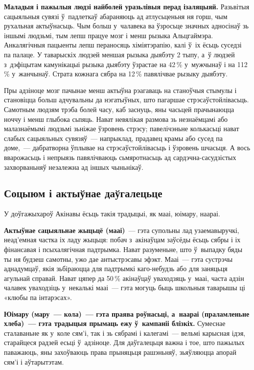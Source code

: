 \textbf{Маладыя і пажылыя людзі найболей уразьлівыя перад ізаляцыяй.} Разьвітыя сацыяльныя сувязі ў~падлеткаў абараняюць ад атлусьценьня ня горш, чым рухальная актыўнасьць. Чым больш у~чалавека ва ўзросьце значных адносінаў зь іншымі людзьмі, тым лепш працуе мозг і менш рызыка Альцгаймэра. Анкалягічныя пацыенты лепш пераносяць хіміятэрапію, калі ў~іх ёсьць суседзі па палаце. У таварыскіх людзей меншая рызыка дыябэту 2 тыпу, а~ў людзей з~дэфіцытам камунікацыі рызыка дыябэту ўзрастае на 42\,\% у~мужчынаў і на 112\,\% у~жанчынаў. Страта кожнага сябра на 12\,\% павялічвае рызыку дыябэту.


Пры адзіноце мозг пачынае менш актыўна рэагаваць на станоўчыя стымулы і становіцца больш адчувальны да нэгатыўных, што пагаршае стрэсаўстойлівасьць. Самотным людзям трэба болей часу, каб заснуць, яны часьцей прачынаюцца ноччу і менш глыбока сьпяць. Нават невялікая размова зь незнаёмцамі або малазнаёмымі людзьмі зьніжае ўзровень стрэсу; павелічэньне колькасьці нават слабых сацыяльных сувязяў~--- напрыклад, прадавец крамы або сусед па доме,~--- дабратворна ўплывае на стрэсаўстойлівасьць і ўзровень шчасьця. А вось вварожасьць і непрыязь павялічваюць сьмяротнасьць ад сардэчна-сасудзістых захворваньняў незалежна ад іншых чыньнікаў. 

\subsection*{Соцыюм і актыўнае даўгалецьце}

У доўгажыхароў Акінавы ёсьць такія традыцыі, як мааі, юімару, наараі.

\textbf{Актыўнае сацыяльнае жыцьцё (мааі)}~--- гэта супольны лад узаемавыручкі, неад'емная частка іх ладу жыцьця: побач з~акінаўцам заўсёды ёсьць сябры і іх фінансавая і псыхалягічная падтрымка. Нават разуменьне, што ў~выпадку бяды ты ня будзеш самотны, ужо дае антыстрэсавы эфэкт. Мааі~--- гэта сустрэчы аднадумцаў, якія зьбіраюцца для падтрымкі каго-небудзь або для заняцьця агульнай справай. Нават цяпер да 50\,\% акінаўцаў уваходзяць у~мааі, часта адзін чалавек уваходзіць у~некалькі мааі~--- гэта могуць быць школьныя таварышы ці «клюбы па інтарэсах».

\textbf{Юімару (мару~--- кола)~--- гэта праява роўнасьці, а~наараі (праламленьне хлеба)~--- гэта традыцыя прымаць ежу ў~кампаніі блізкіх.} Сумеснае сталаваньне як у~коле сям'і, так і зь сябрамі і калегамі~--- вельмі карысная ідэя, старайцеся радзей есьці ў~адзіноце. Для даўгалецьця важна і тое, што пажылых паважаюць, яны захоўваюць права прыняцьця рашэньняў, зьяўляюцца апорай сям'і і аўтарытэтам.

